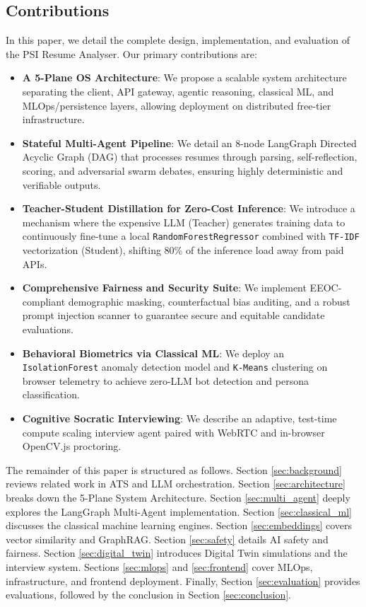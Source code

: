 \documentclass[10pt,journal,compsoc]{IEEEtran}
\begin{document}
\subsection{Contributions}
In this paper, we detail the complete design, implementation, and evaluation of the PSI Resume Analyser. Our primary contributions are:
\begin{itemize}
    \item \textbf{A 5-Plane OS Architecture}: We propose a scalable system architecture separating the client, API gateway, agentic reasoning, classical ML, and MLOps/persistence layers, allowing deployment on distributed free-tier infrastructure.
    \item \textbf{Stateful Multi-Agent Pipeline}: We detail an 8-node LangGraph Directed Acyclic Graph (DAG) that processes resumes through parsing, self-reflection, scoring, and adversarial swarm debates, ensuring highly deterministic and verifiable outputs.
    \item \textbf{Teacher-Student Distillation for Zero-Cost Inference}: We introduce a mechanism where the expensive LLM (Teacher) generates training data to continuously fine-tune a local \texttt{RandomForestRegressor} combined with \texttt{TF-IDF} vectorization (Student), shifting 80\% of the inference load away from paid APIs.
    \item \textbf{Comprehensive Fairness and Security Suite}: We implement EEOC-compliant demographic masking, counterfactual bias auditing, and a robust prompt injection scanner to guarantee secure and equitable candidate evaluations.
    \item \textbf{Behavioral Biometrics via Classical ML}: We deploy an \texttt{IsolationForest} anomaly detection model and \texttt{K-Means} clustering on browser telemetry to achieve zero-LLM bot detection and persona classification.
    \item \textbf{Cognitive Socratic Interviewing}: We describe an adaptive, test-time compute scaling interview agent paired with WebRTC and in-browser OpenCV.js proctoring.
\end{itemize}

The remainder of this paper is structured as follows. Section \ref{sec:background} reviews related work in ATS and LLM orchestration. Section \ref{sec:architecture} breaks down the 5-Plane System Architecture. Section \ref{sec:multi_agent} deeply explores the LangGraph Multi-Agent implementation. Section \ref{sec:classical_ml} discusses the classical machine learning engines. Section \ref{sec:embeddings} covers vector similarity and GraphRAG. Section \ref{sec:safety} details AI safety and fairness. Section \ref{sec:digital_twin} introduces Digital Twin simulations and the interview system. Sections \ref{sec:mlops} and \ref{sec:frontend} cover MLOps, infrastructure, and frontend deployment. Finally, Section \ref{sec:evaluation} provides evaluations, followed by the conclusion in Section \ref{sec:conclusion}.
\end{document}

